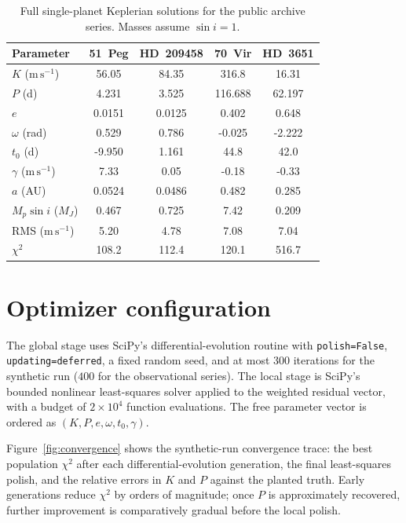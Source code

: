 \documentclass[11pt]{article}
\begin{document}
\begin{table}[H]
\centering
\caption{Full single-planet Keplerian solutions for the public archive series.
Masses assume $\sin i = 1$.}
\label{tab:obs-full}
\begin{tabular}{@{}lcccc@{}}
\toprule
Parameter & 51~Peg & HD~209458 & 70~Vir & HD~3651 \\
\midrule
$K$ ($\mathrm{m\,s^{-1}}$) & 56.05 & 84.35 & 316.8 & 16.31 \\
$P$ (d) & 4.231 & 3.525 & 116.688 & 62.197 \\
$e$ & 0.0151 & 0.0125 & 0.402 & 0.648 \\
$\omega$ (rad) & 0.529 & 0.786 & -0.025 & -2.222 \\
$t_0$ (d) & -9.950 & 1.161 & 44.8 & 42.0 \\
$\gamma$ ($\mathrm{m\,s^{-1}}$) & 7.33 & 0.05 & -0.18 & -0.33 \\
$a$ (AU) & 0.0524 & 0.0486 & 0.482 & 0.285 \\
$M_p\sin i$ ($M_J$) & 0.467 & 0.725 & 7.42 & 0.209 \\
RMS ($\mathrm{m\,s^{-1}}$) & 5.20 & 4.78 & 7.08 & 7.04 \\
$\chi^2$ & 108.2 & 112.4 & 120.1 & 516.7 \\
\bottomrule
\end{tabular}
\end{table}

\section{Optimizer configuration}
\label{app:optimizer}

The global stage uses SciPy's differential-evolution routine with
\texttt{polish=False}, \texttt{updating=deferred}, a fixed random seed, and
at most $300$ iterations for the synthetic run ($400$ for the observational
series). The local stage is SciPy's bounded nonlinear least-squares solver
applied to the weighted residual vector, with a budget of
$2\times 10^4$ function evaluations. The free parameter vector is ordered as
$(K, P, e, \omega, t_0, \gamma)$.

Figure~\ref{fig:convergence} shows the synthetic-run convergence trace: the
best population $\chi^2$ after each differential-evolution generation, the
final least-squares polish, and the relative errors in $K$ and $P$ against the
planted truth. Early generations reduce $\chi^2$ by orders of magnitude; once
$P$ is approximately recovered, further improvement is comparatively gradual
before the local polish.
\end{document}

